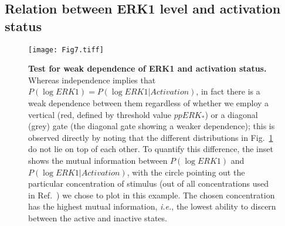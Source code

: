 \documentclass[11pt,a4paper,draft]{article}
\begin{document}
\subsection*{Relation between ERK1 level and activation status}
\begin{figure}[!htb]
 \centering
   \texttt{[image: Fig7.tiff]}  
  \caption{{\bf Test for weak dependence of ERK1 and activation status.} Whereas independence implies that $P(\log ERK1) = P(\log ERK1 \vert Activation)$, in fact there is a weak dependence between them regardless of whether we employ a vertical (red, defined by threshold value $ppERK_*$) or a diagonal (grey) gate (the diagonal gate showing a weaker dependence); this is observed directly by noting that the different distributions in Fig.~\ref{S1_Fig} do not lie on top of each other. To quantify this difference, the inset shows the mutual information between $P(\log ERK1)$ and $P(\log ERK1 | Activation)$, with the circle pointing out the particular concentration of stimulus (out of all concentrations used in Ref.~\cite{Feinerman2008}) we chose to plot in this example. The chosen concentration has the highest mutual information, {\it i.e.}, the lowest ability to discern between the active and inactive states.}
  \label{S1_Fig}
\end{figure}
\end{document}

